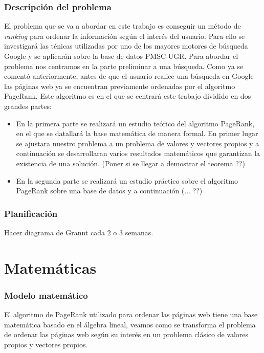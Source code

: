 \documentclass[size=a4, parskip=half, titlepage=false, toc=flat, toc=bib, 12pt]{scrartcl}
\theoremstyle{theorem-style}
\theoremstyle{definition-style}
\theoremstyle{remark-style}
\theoremstyle{example-style}
\theoremstyle{definition-style}
\theoremstyle{remark-style}
\begin{document}
\begin{itemize}
\end{itemize}

\newpage

\section{Descripción del problema}
El problema que se va a abordar en este trabajo es conseguir un método de \textit{ranking} para ordenar la información según el interés del usuario. Para ello se investigará las ténicas utilizadas por uno de los mayores motores de búsqueda Google y se aplicarán sobre la base de datos PMSC-UGR. Para abordar el problema nos centramos en la parte preliminar a una búsqueda. Como ya se comentó anteriormente, antes de que el usuario realice una búsqueda en Google las páginas web ya se encuentran previamente ordenadas por el algoritmo PageRank. Este algoritmo  es en el que se centrará este trabajo dividido en dos grandes partes:
\begin{itemize}
\item En la primera parte se realizará un estudio teórico del algoritmo PageRank, en el que se datallará la base matemática de manera formal. En primer lugar se ajustara nuestro problema a un problema de valores y vectores propios y a continuación se desarrollaran varios resultados matemáticos que garantizan la existencia de una solución. (Poner si se llegar a demostrar el teorema ??)
\item En la segunda parte se realizará un estudio práctico sobre el algoritmo PageRank sobre una base de datos y a continuación (... ??)
\end{itemize}

\section{Planificación}
Hacer diagrama de Grannt cada 2 o 3 semanas.

\newpage

\part{Matemáticas}

\section{Modelo matemático}

El algoritmo de PageRank utilizado para ordenar las páginas web tiene una base matemática basado en el álgebra lineal, veamos como se transforma el problema de ordenar las páginas web según su interés en un problema clásico de valores propios y vectores propios.
\end{document}
